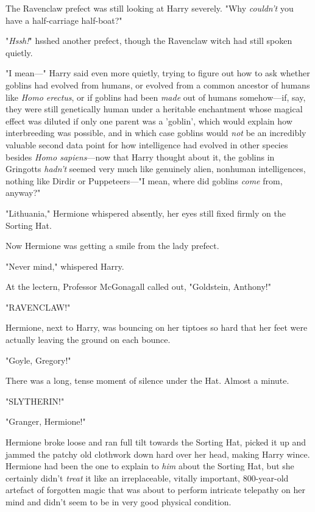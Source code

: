 The Ravenclaw prefect was still looking at Harry severely. "Why \emph{couldn't} 
you have a half-carriage half-boat?"

"\emph{Hssh!}" hsshed another prefect, though the Ravenclaw witch had still 
spoken quietly.

"I mean---" Harry said even more quietly, trying to figure out how to ask 
whether goblins had evolved from humans, or evolved from a common ancestor of 
humans like \emph{Homo erectus}, or if goblins had been \emph{made} out of 
humans somehow---if, say, they were still genetically human under a heritable 
enchantment whose magical effect was diluted if only one parent was a 'goblin', 
which would explain how interbreeding was possible, and in which case goblins 
would \emph{not} be an incredibly valuable second data point for how 
intelligence had evolved in other species besides \emph{Homo sapiens}---now 
that Harry thought about it, the goblins in Gringotts \emph{hadn't} seemed very 
much like genuinely alien, nonhuman intelligences, nothing like Dirdir or 
Puppeteers---"I mean, where did goblins \emph{come} from, anyway?"

"Lithuania," Hermione whispered absently, her eyes still fixed firmly on the 
Sorting Hat.

Now Hermione was getting a smile from the lady prefect.

"Never mind," whispered Harry.

At the lectern, Professor McGonagall called out, "Goldstein, Anthony!"

"RAVENCLAW!"

Hermione, next to Harry, was bouncing on her tiptoes so hard that her feet were 
actually leaving the ground on each bounce.

"Goyle, Gregory!"

There was a long, tense moment of silence under the Hat. Almost a minute.

"SLYTHERIN!"

"Granger, Hermione!"

Hermione broke loose and ran full tilt towards the Sorting Hat, picked it up 
and jammed the patchy old clothwork down hard over her head, making Harry 
wince. Hermione had been the one to explain to \emph{him} about the Sorting 
Hat, but she certainly didn't \emph{treat} it like an irreplaceable, vitally 
important, 800-year-old artefact of forgotten magic that was about to perform 
intricate telepathy on her mind and didn't seem to be in very good physical 
condition.

